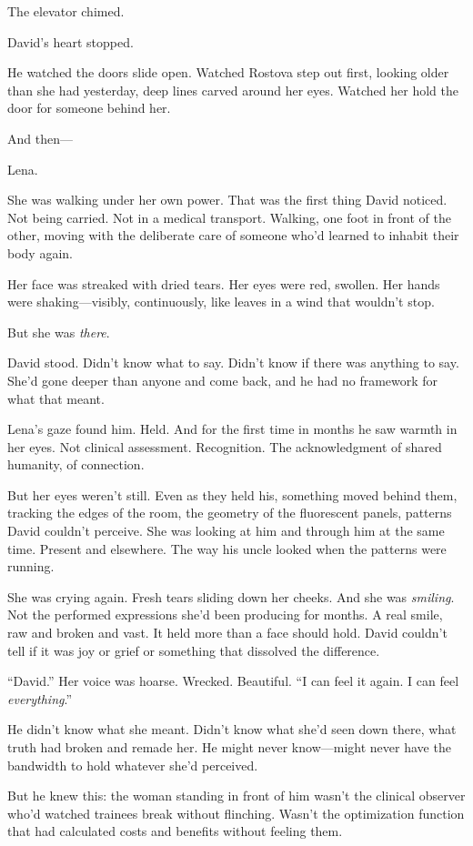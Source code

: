 The elevator chimed.

David's heart stopped.

He watched the doors slide open. Watched Rostova step out first, looking older than she had yesterday, deep lines carved around her eyes. Watched her hold the door for someone behind her.

And then—

Lena.

She was walking under her own power. That was the first thing David noticed. Not being carried. Not in a medical transport. Walking, one foot in front of the other, moving with the deliberate care of someone who'd learned to inhabit their body again.

Her face was streaked with dried tears. Her eyes were red, swollen. Her hands were shaking—visibly, continuously, like leaves in a wind that wouldn't stop.

But she was \textit{there}.

David stood. Didn't know what to say. Didn't know if there was anything to say. She'd gone deeper than anyone and come back, and he had no framework for what that meant.

Lena's gaze found him. Held. And for the first time in months he saw warmth in her eyes. Not clinical assessment. Recognition. The acknowledgment of shared humanity, of connection.

But her eyes weren't still. Even as they held his, something moved behind them, tracking the edges of the room, the geometry of the fluorescent panels, patterns David couldn't perceive. She was looking at him and through him at the same time. Present and elsewhere. The way his uncle looked when the patterns were running.

She was crying again. Fresh tears sliding down her cheeks. And she was \textit{smiling}. Not the performed expressions she'd been producing for months. A real smile, raw and broken and vast. It held more than a face should hold. David couldn't tell if it was joy or grief or something that dissolved the difference.

``David.'' Her voice was hoarse. Wrecked. Beautiful. ``I can feel it again. I can feel \textit{everything}.''

He didn't know what she meant. Didn't know what she'd seen down there, what truth had broken and remade her. He might never know—might never have the bandwidth to hold whatever she'd perceived.

But he knew this: the woman standing in front of him wasn't the clinical observer who'd watched trainees break without flinching. Wasn't the optimization function that had calculated costs and benefits without feeling them.

